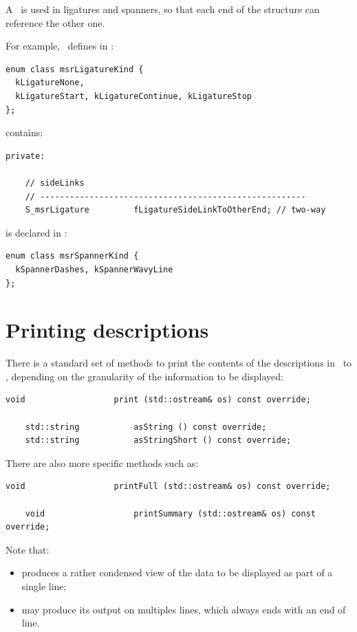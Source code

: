 A \sideLink\ is used in ligatures and spanners, so that each end of the structure can reference the other one.

For example, \mf\ defines  in :
\begin{lstlisting}[language=CPlusPlus]
enum class msrLigatureKind {
  kLigatureNone,
  kLigatureStart, kLigatureContinue, kLigatureStop
};
\end{lstlisting}

 contains:
\begin{lstlisting}[language=CPlusPlus]
  private:

    // sideLinks
    // ------------------------------------------------------
    S_msrLigature         fLigatureSideLinkToOtherEnd; // two-way
\end{lstlisting}

\EnumType{} is declared in :
\begin{lstlisting}[language=CPlusPlus]
enum class msrSpannerKind {
  kSpannerDashes, kSpannerWavyLine
};
\end{lstlisting}


\section{Printing descriptions}\label{Printing descriptions}

There is a standard set of methods to print the contents of the descriptions in \mf\ to \standardOutput, depending on the granularity of the information to be displayed:
\begin{lstlisting}[language=CPlusPlus]
    void                  print (std::ostream& os) const override;

    std::string           asString () const override;
    std::string           asStringShort () const override;
\end{lstlisting}

There are also more specific methods such as:
\begin{lstlisting}[language=CPlusPlus]
    void                  printFull (std::ostream& os) const override;

    void                  printSummary (std::ostream& os) const override;
\end{lstlisting}

Note that:
\begin{itemize}
\item {} produces a rather condensed view of the data to be displayed as part of a single line;
\item {} may produce its output on multiples lines, which always ends with an end of line.
\end{itemize}

